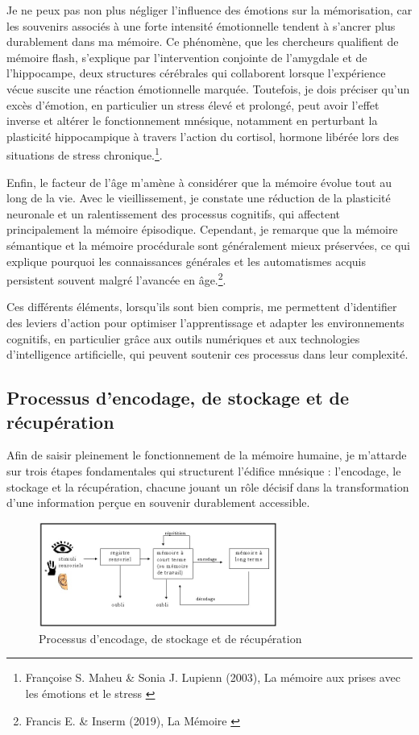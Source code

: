 \documentclass[11pt,a4paper]{report}
\begin{document}
Je ne peux pas non plus négliger l’influence des émotions sur la mémorisation, car les souvenirs associés à une forte intensité émotionnelle tendent à s’ancrer plus durablement dans ma mémoire. Ce phénomène, que les chercheurs qualifient de mémoire flash, s’explique par l’intervention conjointe de l’amygdale et de l’hippocampe, deux structures cérébrales qui collaborent lorsque l’expérience vécue suscite une réaction émotionnelle marquée. Toutefois, je dois préciser qu’un excès d’émotion, en particulier un stress élevé et prolongé, peut avoir l’effet inverse et altérer le fonctionnement mnésique, notamment en perturbant la plasticité hippocampique à travers l’action du cortisol, hormone libérée lors des situations de stress chronique.\footnote{Françoise S. Maheu \& Sonia J. Lupienn (2003), La mémoire aux prises avec les émotions et le stress \cite{maheulupienn}}.

Enfin, le facteur de l’âge m’amène à considérer que la mémoire évolue tout au long de la vie. Avec le vieillissement, je constate une réduction de la plasticité neuronale et un ralentissement des processus cognitifs, qui affectent principalement la mémoire épisodique. Cependant, je remarque que la mémoire sémantique et la mémoire procédurale sont généralement mieux préservées, ce qui explique pourquoi les connaissances générales et les automatismes acquis persistent souvent malgré l’avancée en âge.\footnote{Francis E. \& Inserm (2019), La Mémoire \cite{inserm}}.

Ces différents éléments, lorsqu’ils sont bien compris, me permettent d’identifier des leviers d’action pour optimiser l’apprentissage et adapter les environnements cognitifs, en particulier grâce aux outils numériques et aux technologies d’intelligence artificielle, qui peuvent soutenir ces processus dans leur complexité.

\subsection{Processus d’encodage, de stockage et de récupération}

Afin de saisir pleinement le fonctionnement de la mémoire humaine, je m’attarde sur trois étapes fondamentales qui structurent l’édifice mnésique : l’encodage, le stockage et la récupération, chacune jouant un rôle décisif dans la transformation d’une information perçue en souvenir durablement accessible.

\begin{figure}[h]
    \centering
    \includegraphics[width=0.7\textwidth]{images/1.1.3.jpg}
    \caption{Processus d’encodage, de stockage et de récupération}
    \label{fig:1.1.3}
\end{figure}
\end{document}
